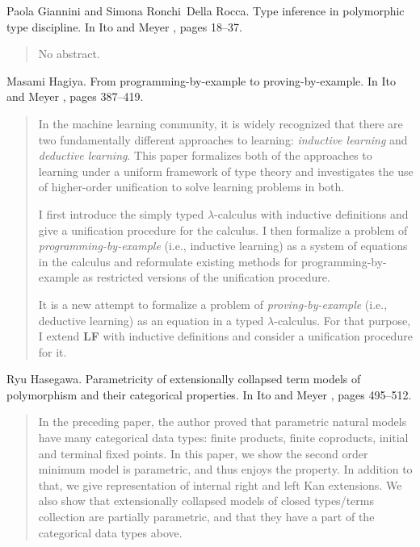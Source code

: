 \begin{thebibliography}{10}
Paola Giannini and Simona Ronchi~Della Rocca.
\newblock Type inference in polymorphic type discipline.
\newblock In Ito and Meyer \cite{TACS91}, pages 18--37.
\begin{quotation}
No abstract.
\end{quotation}

Masami Hagiya.
\newblock From programming-by-example to proving-by-example.
\newblock In Ito and Meyer \cite{TACS91}, pages 387--419.
\begin{quotation}
In the machine learning community, it is widely recognized that there are two
  fundamentally different approaches to learning: {\em inductive learning\/}
  and {\em deductive learning}. This paper formalizes both of the approaches to
  learning under a uniform framework of type theory and investigates the use of
  higher-order unification to solve learning problems in both. \par I first
  introduce the simply typed $\lambda$-calculus with inductive definitions and
  give a unification procedure for the calculus. I then formalize a problem of
  {\em programming-by-example\/} (i.e., inductive learning) as a system of
  equations in the calculus and reformulate existing methods for
  programming-by-example as restricted versions of the unification procedure.
  \par It is a new attempt to formalize a problem of {\em proving-by-example\/}
  (i.e., deductive learning) as an equation in a typed $\lambda$-calculus. For
  that purpose, I extend {\bf LF} with inductive definitions and consider a
  unification procedure for it.
\end{quotation}

Ryu Hasegawa.
\newblock Parametricity of extensionally collapsed term models of polymorphism
  and their categorical properties.
\newblock In Ito and Meyer \cite{TACS91}, pages 495--512.
\begin{quotation}
In the preceding paper, the author proved that parametric natural models have
  many categorical data types: finite products, finite coproducts, initial and
  terminal fixed points. In this paper, we show the second order minimum model
  is parametric, and thus enjoys the property. In addition to that, we give
  representation of internal right and left Kan extensions. We also show that
  extensionally collapsed models of closed types/terms collection are partially
  parametric, and that they have a part of the categorical data types above.
\end{quotation}


\end{thebibliography}
